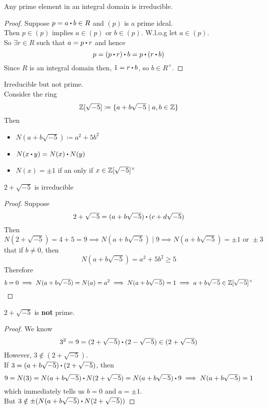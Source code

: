 \documentclass[../Main.tex]{subfiles}
\begin{document}
\begin{prop}[title = Prime elements in integral domain are irreducible]
	Any prime element in an integral domain is irreducible.
\end{prop}
\begin{proof}
	Suppose $p=a\rdot b\in R$ and $(p)$ is a prime ideal.\\
	Then $p\in (p)$ implies $a\in (p)$ or $b\in (p)$. W.l.o.g let $a\in (p)$.\\
	So $\exists r\in R$ such that $a=p\rdot r$ and hence
	\[p=(p\rdot r)\rdot b=p\rdot (r\rdot b)\]
	Since $R$ is an integral domain then, $1=r\rdot b$, so $b\in R^\times $.
\end{proof}
\begin{example}
	Irreducible but not prime.\\
	Consider the ring 
	\[\mathbb{Z}[\sqrt{-5}] \coloneq \{a+b\sqrt{-5}\mid a,b\in \mathbb{Z}\} \]
	Then
	\begin{itemize}
		\item $N(a+b\sqrt{-5}) \coloneqq a^2+5b^2$
		\item $N(x\rdot y)=N(x)\rdot N(y)$
		\item $N(x)=\pm 1$ if an only if $x\in \mathbb{Z}[\sqrt{-5}]^\times$
	\end{itemize}
\end{example}
\begin{claim}
	$2+\sqrt{-5}$ is irreducible
\end{claim}
\begin{proof}
	Suppose 
	\[2+\sqrt{-5}=(a+b\sqrt{-5})\rdot (c+d\sqrt{-5})\]
	Then
	\[N(2+\sqrt{-5}) = 4+5 =9 \implies N(a+b\sqrt{-5})\mid 9 \implies N(a+b\sqrt{-5}) = \pm 1 \text{ or } \pm 3\]
	\Obs that if $b\ne 0$, then \[N(a+b\sqrt{-5}) = a^2+5b^2\ge 5\]
	Therefore
	\[b=0\implies N(a+b\sqrt{-5})=N(a)=a^2\implies N(a+b\sqrt{-5})=1\implies a+b\sqrt{-5}\in \mathbb{Z}[\sqrt{-5}]^\times\]
\end{proof}
\begin{claim}
	$2+\sqrt{-5}$ is \textbf{not} prime.
\end{claim}
\begin{proof}
	We know
	\[3^2=9=(2+\sqrt{-5})\rdot (2-\sqrt{-5}) \in (2+\sqrt{-5})\]
	However, $3\notin (2+\sqrt{-5})$.\\
	If $3=(a+b\sqrt{-5})\rdot (2+\sqrt{-5})$, then 
	\[9=N(3)=N(a+b\sqrt{-5})\rdot N(2+\sqrt{-5}) =N(a+b\sqrt{-5})\rdot 9 \implies N(a+b\sqrt{-5}) =1 \]
	which immediately tells us $b=0$ and $a=\pm 1$.\\
	But $3\notin \pm (N(a+b\sqrt{-5})\rdot N(2+\sqrt{-5}))$
\end{proof}
\end{document}
